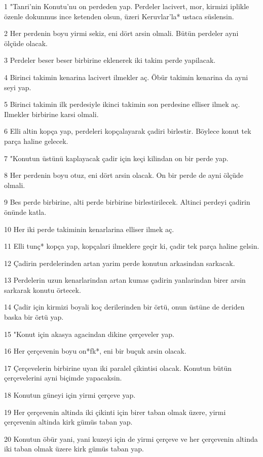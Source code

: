 \par 1 "Tanri'nin Konutu'nu on perdeden yap. Perdeler lacivert, mor, kirmizi iplikle özenle dokunmus ince ketenden olsun, üzeri Keruvlar'la* ustaca süslensin.
\par 2 Her perdenin boyu yirmi sekiz, eni dört arsin olmali. Bütün perdeler ayni ölçüde olacak.
\par 3 Perdeler beser beser birbirine eklenerek iki takim perde yapilacak.
\par 4 Birinci takimin kenarina lacivert ilmekler aç. Öbür takimin kenarina da ayni seyi yap.
\par 5 Birinci takimin ilk perdesiyle ikinci takimin son perdesine elliser ilmek aç. Ilmekler birbirine karsi olmali.
\par 6 Elli altin kopça yap, perdeleri kopçalayarak çadiri birlestir. Böylece konut tek parça haline gelecek.
\par 7 "Konutun üstünü kaplayacak çadir için keçi kilindan on bir perde yap.
\par 8 Her perdenin boyu otuz, eni dört arsin olacak. On bir perde de ayni ölçüde olmali.
\par 9 Bes perde birbirine, alti perde birbirine birlestirilecek. Altinci perdeyi çadirin önünde katla.
\par 10 Her iki perde takiminin kenarlarina elliser ilmek aç.
\par 11 Elli tunç* kopça yap, kopçalari ilmeklere geçir ki, çadir tek parça haline gelsin.
\par 12 Çadirin perdelerinden artan yarim perde konutun arkasindan sarkacak.
\par 13 Perdelerin uzun kenarlarindan artan kumas çadirin yanlarindan birer arsin sarkarak konutu örtecek.
\par 14 Çadir için kirmizi boyali koç derilerinden bir örtü, onun üstüne de deriden baska bir örtü yap.
\par 15 "Konut için akasya agacindan dikine çerçeveler yap.
\par 16 Her çerçevenin boyu on*fk*, eni bir buçuk arsin olacak.
\par 17 Çerçevelerin birbirine uyan iki paralel çikintisi olacak. Konutun bütün çerçevelerini ayni biçimde yapacaksin.
\par 18 Konutun güneyi için yirmi çerçeve yap.
\par 19 Her çerçevenin altinda iki çikinti için birer taban olmak üzere, yirmi çerçevenin altinda kirk gümüs taban yap.
\par 20 Konutun öbür yani, yani kuzeyi için de yirmi çerçeve ve her çerçevenin altinda iki taban olmak üzere kirk gümüs taban yap.
